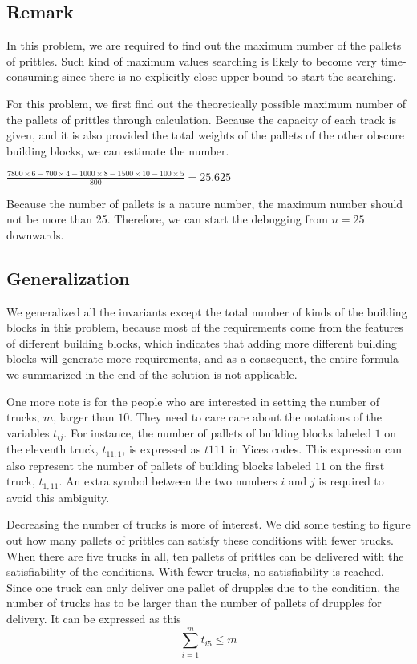 \documentclass[11pt]{article}
\begin{document}
\subsection*{Remark}
In this problem, we are required to find out the maximum number of the pallets of prittles. Such kind of maximum values searching is likely to become very time-consuming since there is no explicitly close upper bound to start the searching.

For this problem, we first find out the theoretically possible maximum number of the pallets of prittles through calculation. Because the capacity of each track is given, and it is also provided the total weights of the pallets of the other obscure building blocks, we can estimate the number.

  $\frac{7800 \times 6 - 700\times4 - 1000\times8 - 1500\times10 - 100\times5}{800} = 25.625$

Because the number of pallets is a nature number, the maximum number should not be more than 25. Therefore, we can start the debugging from $n = 25$ downwards.

\subsection*{Generalization}

We generalized all the invariants except the total number of kinds of the building blocks in this problem, because most of the requirements come from the features of different building blocks, which indicates that adding more different building blocks will generate more requirements, and as a consequent, the entire formula we summarized in the end of the solution is not applicable.

One more note is for the people who are interested in setting the number of trucks, $m$, larger than $10$. They need to care care about the notations of the variables $t_{ij}$. For instance, the number of pallets of building blocks labeled $1$ on the eleventh truck, $t_{11,1}$, is expressed as  $t111$ in Yices codes. This expression can also represent the number of pallets of building blocks labeled $11$ on the first truck, $t_{1,11}$. An extra symbol between the two numbers $i$ and $j$ is required to avoid this ambiguity.

Decreasing the number of trucks is more of interest. We did some testing to figure out how many pallets of prittles can satisfy these conditions with fewer trucks. When there are five trucks in all, ten pallets of prittles can be delivered with the satisfiability of the conditions. With fewer trucks, no satisfiability is reached. Since one truck can only deliver one pallet of drupples due to the condition, the number of trucks has to be larger than the number of pallets of drupples for delivery. It can be expressed as this
\[ \sum_{i=1}^m t_{i5}\leq m \]

\newpage



\newpage


\newpage

\end{document}
